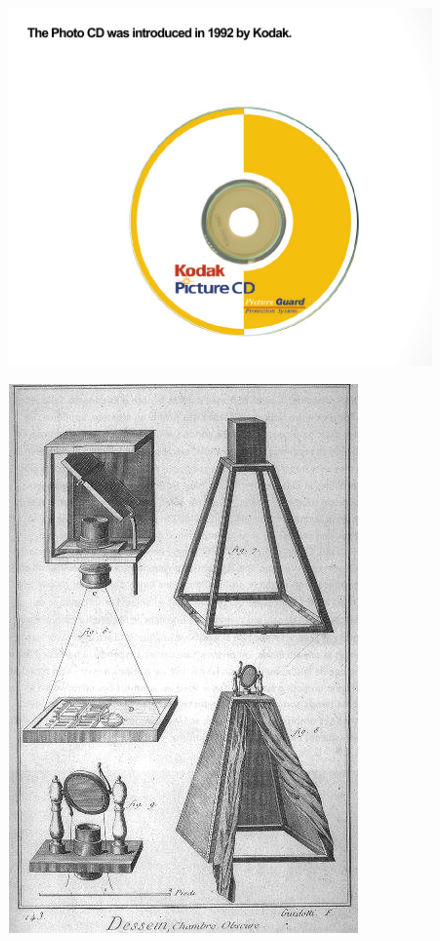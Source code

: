 \documentclass{beamer}
\begin{document}
\begin{frame}
	\begin{figure}
		\centering
		\includegraphics[scale=0.4]{111.jpg}
	\end{figure}
\end{frame}

\begin{frame}
	\begin{figure}
		\centering
		\includegraphics[scale=0.4]{120.jpg}
	\end{figure}
\end{frame}
\end{document}
